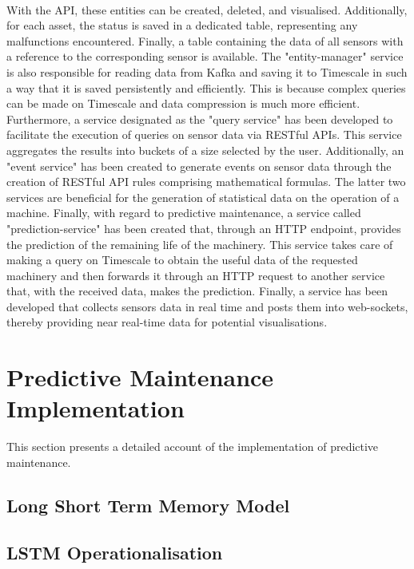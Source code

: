  \\With the API, these entities can be created, deleted, and visualised. Additionally, for each asset, the status is saved in a dedicated table, representing any malfunctions encountered. Finally, a table containing the data of all sensors with a reference to the corresponding sensor is available. The "entity-manager" service is also responsible for reading data from Kafka and saving it to Timescale in such a way that it is saved persistently and efficiently. This is because complex queries can be made on Timescale and data compression is much more efficient. Furthermore, a service designated as the "query service" has been developed to facilitate the execution of queries on sensor data via RESTful APIs. This service aggregates the results into buckets of a size selected by the user. Additionally, an "event service" has been created to generate events on sensor data through the creation of RESTful API rules comprising mathematical formulas. The latter two services are beneficial for the generation of statistical data on the operation of a machine. Finally, with regard to predictive maintenance, a service called "prediction-service" has been created that, through an HTTP endpoint, provides the prediction of the remaining life of the machinery. This service takes care of making a query on Timescale to obtain the useful data of the requested machinery and then forwards it through an HTTP request to another service that, with the received data, makes the prediction. Finally, a service has been developed that collects sensors data in real time and posts them into web-sockets, thereby providing near real-time data for potential visualisations.
\section{Predictive Maintenance Implementation}
This section presents a detailed account of the implementation of predictive maintenance.
\subsection{Long Short Term Memory Model}

\subsection{LSTM Operationalisation}














